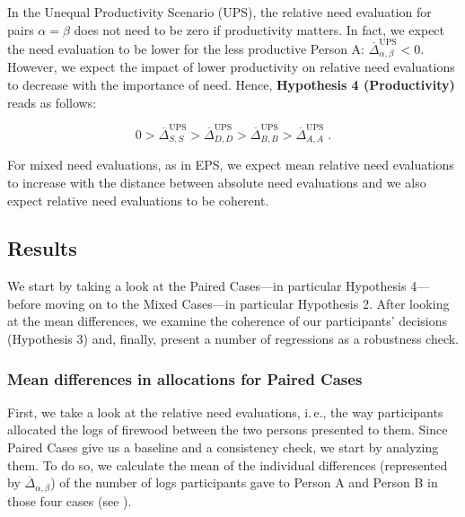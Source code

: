 \documentclass[10pt,letterpaper]{article}
\begin{document}
In the Unequal Productivity Scenario (UPS), the relative need evaluation for pairs $\alpha=\beta$ does not need to be zero if productivity matters.
In fact, we expect the need evaluation to be lower for the less productive Person A: $\overline{\Delta}^\text{UPS}_{\alpha,\beta}<0$.
However, we expect the impact of lower productivity on relative need evaluations to decrease with the importance of need.
Hence, \textbf{Hypothesis 4 (Productivity)} reads as follows:

\begin{equation}
   0>\overline{\Delta}^\text{UPS}_{S,S}>\overline{\Delta}^\text{UPS}_{D,D}>\overline{\Delta}^\text{UPS}_{B,B}>\overline{\Delta}^\text{UPS}_{A,A}\;.
\end{equation}

For mixed need evaluations, as in EPS, we expect mean relative need evaluations to increase with the distance between absolute need evaluations and we also expect relative need evaluations to be coherent.


\subsection*{Results}\label{sec:results}
We start by taking a look at the Paired Cases---in particular Hypothesis 4---before moving on to the Mixed Cases---in particular Hypothesis 2.
After looking at the mean differences, we examine the coherence of our participants' decisions (Hypothesis 3) and, finally, present a number of regressions as a robustness check.


\subsubsection*{Mean differences in allocations for Paired Cases}\label{sec:results_mean_paired}
First, we take a look at the relative need evaluations, i.\,e., the way participants allocated the logs of firewood between the two persons presented to them.
Since Paired Cases give us a baseline and a consistency check, we start by analyzing them.
To do so, we calculate the mean of the individual differences (represented by $\overline{\Delta}_{\alpha,\beta}$) of the number of logs participants gave to Person A and Person B in those four cases (see ).
\end{document}

